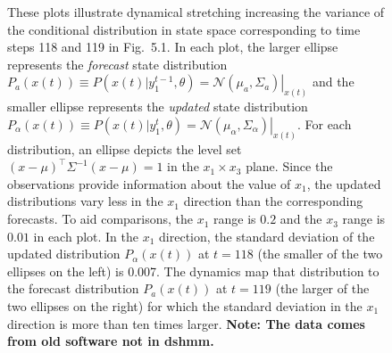 \documentclass[prelim,showlabels]{book}
\newcommand{\NormalE}[3]{{\mathcal{N}}\left.\left(#1,#2\right)\right|_{#3}}
\newcommand{\transpose}{^\top}
\newcommand{\ti}[2]{{#1}{(#2)}}                  %
\newcommand{\ts}[3]{#1_{#2}^{#3}}                    %
\begin{document}
\begin{figure}[htbp]
  \caption[Dynamical stretching increases state variance.]%
  {These plots illustrate dynamical stretching increasing the variance
    of the conditional distribution in state space corresponding to
    time steps 118 and 119 in Fig.~5.1.  In each plot, the larger
    ellipse represents the \emph{forecast} state distribution $P_{a}
    \left(\ti{x}{t} \right) \equiv P
    \left(\ti{x}{t}|\ts{y}{1}{t-1},\theta \right) =
    \NormalE{\mu_a}{\Sigma_a}{\ti{x}{t}}$ and the smaller ellipse
    represents the \emph{updated} state distribution $P_{\alpha}
    \left(\ti{x}{t} \right) \equiv P \left(\ti{x}{t}|\ts{y}{1}{t},
      \theta \right) =
    \NormalE{\mu_\alpha}{\Sigma_\alpha}{\ti{x}{t}}$.  For each
    distribution, an ellipse depicts the level set $(x-\mu)\transpose
    \Sigma^{-1} (x-\mu) =1$ in the $x_1\times x_3$ plane.  Since the
    observations provide information about the value of $x_1$, the
    updated distributions vary less in the $x_1$ direction than the
    corresponding forecasts.  To aid comparisons, the $x_1$ range is
    $0.2$ and the $x_3$ range is $0.01$ in each plot.  In the $x_1$
    direction, the standard deviation of the updated distribution
    $P_{\alpha}(\ti{x}{t})$ at $t=118$ (the smaller of the two
    ellipses on the left) is 0.007.  The dynamics map that
    distribution to the forecast distribution $P_{a}(\ti{x}{t})$ at
    $t=119$ (the larger of the two ellipses on the right) for which
    the standard deviation in the $x_1$ direction is more than ten
    times larger.  \textbf{Note: The data comes from old software not
      in dshmm.}}
  \label{fig:ToyStretch}
\end{figure}
\end{document}
